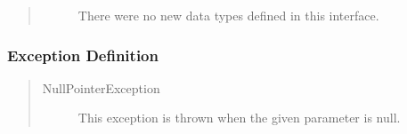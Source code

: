 \begin{quote}
	\begin{description}
		\item[] There were no new data types defined in this interface.
	\end{description} 
\end{quote}

\subsubsection{Exception Definition} 

\begin{quote}
	\begin{description}
		\item[NullPointerException] This exception is thrown when the given parameter
		is null.
	\end{description} 
\end{quote}